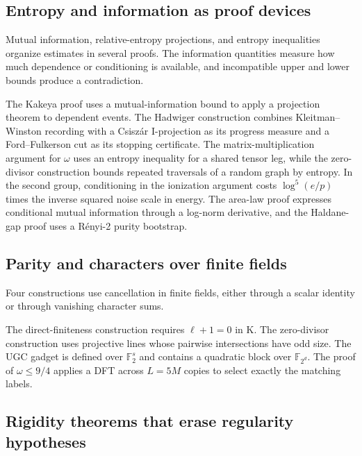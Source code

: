 \documentclass[11pt]{article}
\newcommand{\F}{\mathbb{F}}
\begin{document}
\subsection{\texorpdfstring{Entropy and information as proof devices}{Entropy and information as proof devices}}

Mutual information, relative-entropy projections, and entropy inequalities organize estimates in several proofs. The information quantities measure how much dependence or conditioning is available, and incompatible upper and lower bounds produce a contradiction.

The Kakeya proof uses a mutual-information bound to apply a projection theorem to dependent events. The Hadwiger construction combines Kleitman--Winston recording with a Csiszár I-projection as its progress measure and a Ford--Fulkerson cut as its stopping certificate. The matrix-multiplication argument for $\omega$ uses an entropy inequality for a shared tensor leg, while the zero-divisor construction bounds repeated traversals of a random graph by entropy. In the second group, conditioning in the ionization argument costs $\log^5(e/p)$ times the inverse squared noise scale in energy. The area-law proof expresses conditional mutual information through a log-norm derivative, and the Haldane-gap proof uses a Rényi-2 purity bootstrap.

\subsection{\texorpdfstring{Parity and characters over finite fields}{Parity and characters over finite fields}}

Four constructions use cancellation in finite fields, either through a scalar identity or through vanishing character sums.

The direct-finiteness construction requires $\ell+1=0$ in K. The zero-divisor construction uses projective lines whose pairwise intersections have odd size. The UGC gadget is defined over $\F_2^s$ and contains a quadratic block over $\F_{2^d}$. The proof of $\omega \le 9/4$ applies a DFT across $L=5M$ copies to select exactly the matching labels.

\subsection{\texorpdfstring{Rigidity theorems that erase regularity hypotheses}{Rigidity theorems that erase regularity hypotheses}}
\end{document}
